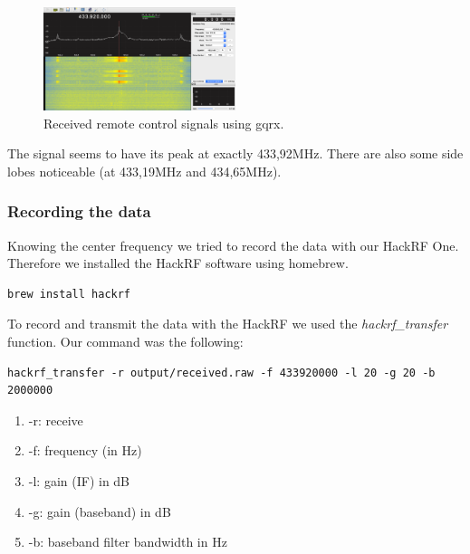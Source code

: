 \documentclass[conference]{IEEEtran}
\begin{document}
\begin{figure}[H]
	\centering
	\includegraphics[width=0.5\textwidth]{gqrx_remote_control}
	\caption{Received remote control signals using gqrx.}
	\label{fig:remote_gqrx}
\end{figure}

The signal seems to have its peak at exactly 433,92MHz. There are also some side lobes noticeable (at 433,19MHz and 434,65MHz). 
\\
\subsubsection{Recording the data}
Knowing the center frequency we tried to record the data with our HackRF One.  Therefore we installed the HackRF software \cite{hackrfsoftware} using homebrew.
\begin{lstlisting}
brew install hackrf
\end{lstlisting}

To record and transmit the data with the HackRF we used the \textit{hackrf\_transfer} function. Our command was the following:
\begin{lstlisting}
hackrf_transfer -r output/received.raw -f 433920000 -l 20 -g 20 -b 2000000
\end{lstlisting}
\begin{enumerate}
	\item -r: receive
	\item -f: frequency (in Hz)
	\item -l: gain (IF) in dB
	\item -g: gain (baseband) in dB
	\item -b: baseband filter bandwidth in Hz
\end{enumerate}
\bigbreak
\end{document}
